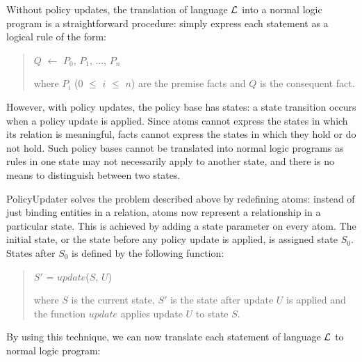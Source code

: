 \documentclass[11pt]{llncs}
\begin{document}

      Without policy updates, the translation of language ${\cal L}$ into a
      normal logic program is a straightforward procedure: simply express each
      statement as a logical rule of the form:

      \begin{quote}
        $Q$ $\leftarrow$ $P_{0}$, $P_{1}$, ..., $P_{n}$

        where $P_{i}$ ($0$ $\leq$ $i$ $\leq$ $n$) are the premise facts and $Q$
        is the consequent fact.
      \end{quote}

      However, with policy updates, the policy base has states: a state
      transition occurs when a policy update is applied. Since atoms cannot
      express the states in which its relation is meaningful, facts cannot
      express the states in which they hold or do not hold. Such policy bases
      cannot be translated into normal logic programs as rules in one state
      may not necessarily apply to another state, and there is no means to
      distinguish between two states.

      PolicyUpdater solves the problem described above by redefining atoms:
      instead of just binding entities in a relation, atoms now represent
      a relationship in a particular state. This is achieved by adding a state
      parameter on every atom. The initial state, or the state before any
      policy update is applied, is assigned state $S_{0}$. States after $S_{0}$
      is defined by the following function:

      \begin{quote}
        $S'$ = $update$($S$, $U$)

        where $S$ is the current state, $S'$ is the state after update $U$ is
        applied and the function $update$ applies update $U$ to state $S$.
      \end{quote}

      By using this technique, we can now translate each statement of language
      ${\cal L}$ to normal logic program:
\end{document}
